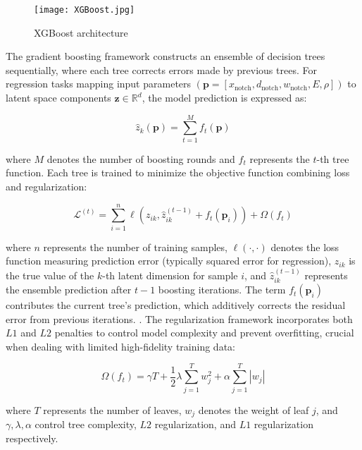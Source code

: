 \documentclass[12pt,a4paper]{report}
\begin{document}
\begin{figure}[htbp]
\centering
\texttt{[image: XGBoost.jpg]}
\caption{XGBoost architecture}
\label{fig:XGBoost}
\end{figure}


The gradient boosting framework constructs an ensemble of decision trees sequentially, where each tree corrects errors made by previous trees. For regression tasks mapping input parameters $(\mathbf{p} = [x_{\text{notch}}, d_{\text{notch}}, w_{\text{notch}}, E, \rho])$ to latent space components $\mathbf{z} \in \mathbb{R}^d$, the model prediction is expressed as:

\begin{equation}
\hat{z}_k(\mathbf{p}) = \sum_{t=1}^{M} f_t(\mathbf{p})
\end{equation}

where $M$ denotes the number of boosting rounds and $f_t$ represents the $t$-th tree function. Each tree is trained to minimize the objective function combining loss and regularization:

\begin{equation}
\mathcal{L}^{(t)} = \sum_{i=1}^{n} \ell(z_{ik}, \hat{z}_{ik}^{(t-1)} + f_t(\mathbf{p}_i)) + \Omega(f_t)
\end{equation}

where $n$ represents the number of training samples, $\ell(\cdot, \cdot)$ denotes the loss function measuring prediction error (typically squared error for regression), $z_{ik}$ is the true value of the $k$-th latent dimension for sample $i$, and $\hat{z}_{ik}^{(t-1)}$ represents the ensemble prediction after $t-1$ boosting iterations. The term $f_t(\mathbf{p}_i)$ contributes the current tree's prediction, which additively corrects the residual error from previous iterations.
. The regularization framework incorporates both $L1$ and $L2$ penalties to control model complexity and prevent overfitting, crucial when dealing with limited high-fidelity training data:

\begin{equation}
\Omega(f_t) = \gamma T + \frac{1}{2} \lambda \sum_{j=1}^T w_j^2 + \alpha \sum_{j=1}^T |w_j|
\end{equation}

where $T$ represents the number of leaves, $w_j$ denotes the weight of leaf $j$, and $\gamma, \lambda, \alpha$ control tree complexity, $L2$ regularization, and $L1$ regularization respectively.
\end{document}
